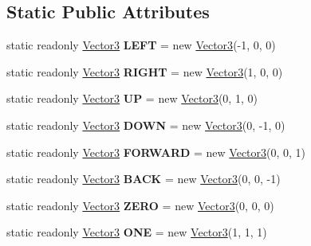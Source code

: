 \subsection*{Static Public Attributes}
\begin{DoxyCompactItemize}
\item 
\hypertarget{struct_engine_1_1_vector3_a98f14741aea1ff8ce1977fd59eca11e8}{static readonly \hyperlink{struct_engine_1_1_vector3}{Vector3} {\bfseries L\-E\-F\-T} = new \hyperlink{struct_engine_1_1_vector3}{Vector3}(-\/1, 0, 0)}\label{struct_engine_1_1_vector3_a98f14741aea1ff8ce1977fd59eca11e8}

\item 
\hypertarget{struct_engine_1_1_vector3_a2dffa4c2a5a7351f506930cb3d3b218a}{static readonly \hyperlink{struct_engine_1_1_vector3}{Vector3} {\bfseries R\-I\-G\-H\-T} = new \hyperlink{struct_engine_1_1_vector3}{Vector3}(1, 0, 0)}\label{struct_engine_1_1_vector3_a2dffa4c2a5a7351f506930cb3d3b218a}

\item 
\hypertarget{struct_engine_1_1_vector3_af95f02622c580516c83d417c51369945}{static readonly \hyperlink{struct_engine_1_1_vector3}{Vector3} {\bfseries U\-P} = new \hyperlink{struct_engine_1_1_vector3}{Vector3}(0, 1, 0)}\label{struct_engine_1_1_vector3_af95f02622c580516c83d417c51369945}

\item 
\hypertarget{struct_engine_1_1_vector3_a9221dd4f93596ec546aa829647b724ec}{static readonly \hyperlink{struct_engine_1_1_vector3}{Vector3} {\bfseries D\-O\-W\-N} = new \hyperlink{struct_engine_1_1_vector3}{Vector3}(0, -\/1, 0)}\label{struct_engine_1_1_vector3_a9221dd4f93596ec546aa829647b724ec}

\item 
\hypertarget{struct_engine_1_1_vector3_a631f338ca8d6ccb270be855080bb0939}{static readonly \hyperlink{struct_engine_1_1_vector3}{Vector3} {\bfseries F\-O\-R\-W\-A\-R\-D} = new \hyperlink{struct_engine_1_1_vector3}{Vector3}(0, 0, 1)}\label{struct_engine_1_1_vector3_a631f338ca8d6ccb270be855080bb0939}

\item 
\hypertarget{struct_engine_1_1_vector3_afcca3cb2be4f271ec385a3e6473d1c3e}{static readonly \hyperlink{struct_engine_1_1_vector3}{Vector3} {\bfseries B\-A\-C\-K} = new \hyperlink{struct_engine_1_1_vector3}{Vector3}(0, 0, -\/1)}\label{struct_engine_1_1_vector3_afcca3cb2be4f271ec385a3e6473d1c3e}

\item 
\hypertarget{struct_engine_1_1_vector3_aea5845afce601259537973d604e6397b}{static readonly \hyperlink{struct_engine_1_1_vector3}{Vector3} {\bfseries Z\-E\-R\-O} = new \hyperlink{struct_engine_1_1_vector3}{Vector3}(0, 0, 0)}\label{struct_engine_1_1_vector3_aea5845afce601259537973d604e6397b}

\item 
\hypertarget{struct_engine_1_1_vector3_a2b3315659c7c8600271cf23144691147}{static readonly \hyperlink{struct_engine_1_1_vector3}{Vector3} {\bfseries O\-N\-E} = new \hyperlink{struct_engine_1_1_vector3}{Vector3}(1, 1, 1)}\label{struct_engine_1_1_vector3_a2b3315659c7c8600271cf23144691147}

\end{DoxyCompactItemize}
